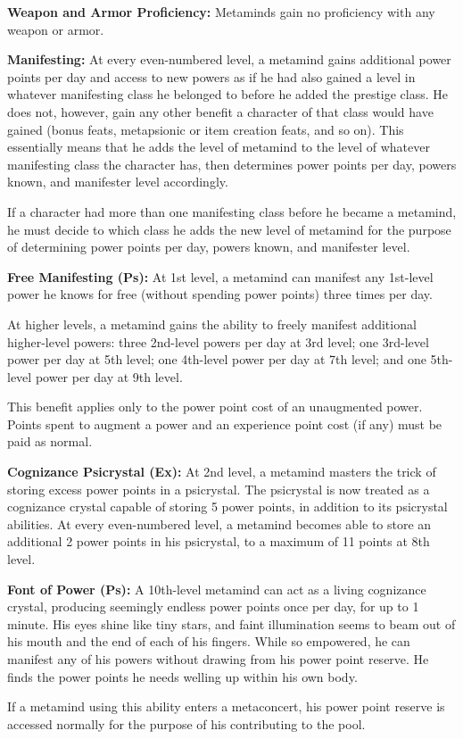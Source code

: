 {
\textbf{Weapon and Armor Proficiency:} Metaminds gain no proficiency with any weapon or armor.

\textbf{Manifesting:} At every even-numbered level, a metamind gains additional power points per day and access to new powers as if he had also gained a level in whatever manifesting class he belonged to before he added the prestige class. He does not, however, gain any other benefit a character of that class would have gained (bonus feats, metapsionic or item creation feats, and so on). This essentially means that he adds the level of metamind to the level of whatever manifesting class the character has, then determines power points per day, powers known, and manifester level accordingly.

If a character had more than one manifesting class before he became a metamind, he must decide to which class he adds the new level of metamind for the purpose of determining power points per day, powers known, and manifester level.

\textbf{Free Manifesting (Ps):} At 1st level, a metamind can manifest any 1st-level power he knows for free (without spending power points) three times per day.

At higher levels, a metamind gains the ability to freely manifest additional higher-level powers: three 2nd-level powers per day at 3rd level; one 3rd-level power per day at 5th level; one 4th-level power per day at 7th level; and one 5th-level power per day at 9th level.

This benefit applies only to the power point cost of an unaugmented power. Points spent to augment a power and an experience point cost (if any) must be paid as normal.

\textbf{Cognizance Psicrystal (Ex):} At 2nd level, a metamind masters the trick of storing excess power points in a psicrystal. The psicrystal is now treated as a cognizance crystal capable of storing 5 power points, in addition to its psicrystal abilities. At every even-numbered level, a metamind becomes able to store an additional 2 power points in his psicrystal, to a maximum of 11 points at 8th level.

\textbf{Font of Power (Ps):} A 10th-level metamind can act as a living cognizance crystal, producing seemingly endless power points once per day, for up to 1 minute. His eyes shine like tiny stars, and faint illumination seems to beam out of his mouth and the end of each of his fingers. While so empowered, he can manifest any of his powers without drawing from his power point reserve. He finds the power points he needs welling up within his own body.

If a metamind using this ability enters a metaconcert, his power point reserve is accessed normally for the purpose of his contributing to the pool.
}
